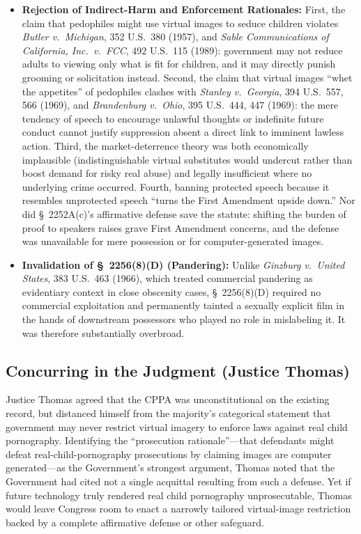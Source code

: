 \documentclass[12pt]{article}
\begin{document}
\begin{itemize}
\item \textbf{Rejection of Indirect-Harm and Enforcement Rationales:} First, the claim that pedophiles might use virtual images to seduce children violates \textit{Butler v.\ Michigan}, 352 U.S.\ 380 (1957), and \textit{Sable Communications of California, Inc.\ v.\ FCC}, 492 U.S.\ 115 (1989): government may not reduce adults to viewing only what is fit for children, and it may directly punish grooming or solicitation instead. Second, the claim that virtual images ``whet the appetites'' of pedophiles clashes with \textit{Stanley v.\ Georgia}, 394 U.S.\ 557, 566 (1969), and \textit{Brandenburg v.\ Ohio}, 395 U.S.\ 444, 447 (1969): the mere tendency of speech to encourage unlawful thoughts or indefinite future conduct cannot justify suppression absent a direct link to imminent lawless action. Third, the market-deterrence theory was both economically implausible (indistinguishable virtual substitutes would undercut rather than boost demand for risky real abuse) and legally insufficient where no underlying crime occurred. Fourth, banning protected speech because it resembles unprotected speech ``turns the First Amendment upside down.'' Nor did \S~2252A(c)'s affirmative defense save the statute: shifting the burden of proof to speakers raises grave First Amendment concerns, and the defense was unavailable for mere possession or for computer-generated images.
\item \textbf{Invalidation of \S~2256(8)(D) (Pandering):} Unlike \textit{Ginzburg v.\ United States}, 383 U.S.\ 463 (1966), which treated commercial pandering as evidentiary context in close obscenity cases, \S~2256(8)(D) required no commercial exploitation and permanently tainted a sexually explicit film in the hands of downstream possessors who played no role in mislabeling it. It was therefore substantially overbroad.
\end{itemize}

\subsection{Concurring in the Judgment (Justice Thomas)}

Justice Thomas agreed that the CPPA was unconstitutional on the existing record, but distanced himself from the majority's categorical statement that government may never restrict virtual imagery to enforce laws against real child pornography. Identifying the ``prosecution rationale''---that defendants might defeat real-child-pornography prosecutions by claiming images are computer generated---as the Government's strongest argument, Thomas noted that the Government had cited not a single acquittal resulting from such a defense. Yet if future technology truly rendered real child pornography unprosecutable, Thomas would leave Congress room to enact a narrowly tailored virtual-image restriction backed by a complete affirmative defense or other safeguard.
\end{document}
